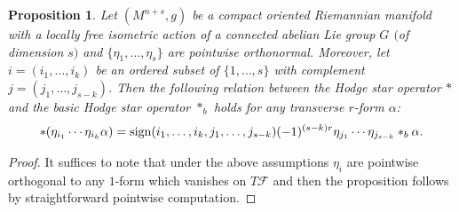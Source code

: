 \documentclass[pdftex]{sigma}
\numberwithin{equation}{section}
\newtheorem{prop}[tw]{Proposition}
\theoremstyle{definition}
\begin{document}
\begin{prop}%
Let $(M^{n+s},g)$ be a compact oriented Riemannian manifold with a locally free isometric action of a connected abelian Lie group $G$ $($of dimension $s)$ and $\{\eta_1,\dots,\eta_s\}$ are pointwise orthonormal. Moreover, let $i=(i_1,\dots,i_k)$ be an ordered subset of $\{1,\dots,s\}$ with complement $j=(j_1,\dots,j_{s-k})$. Then the following relation between the Hodge star operator $*$ and the basic Hodge star operator $*_{b}$ holds for any transverse $r$-form $\alpha$:
\[*(\eta_{i_1}\cdots \eta_{i_k}\alpha)={\rm sign}(i_1,\dots,i_k,j_1,\dots,j_{s-k})(-1)^{(s-k)r}\eta_{j_1}\cdots \eta_{j_{s-k}}*_b\alpha.\]
\end{prop}
\begin{proof} It suffices to note that under the above assumptions $\eta_i$ are pointwise orthogonal to any $1$-form which vanishes on $T\mathcal{F}$ and then the proposition follows by straightforward pointwise computation.
\end{proof}
\end{document}

